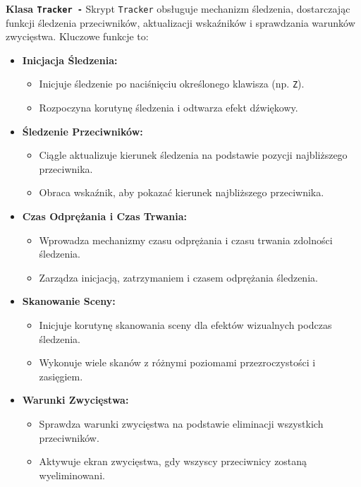 \textbf{Klasa \texttt{Tracker -}}
Skrypt \texttt{Tracker} obsługuje mechanizm śledzenia, dostarczając funkcji śledzenia przeciwników, aktualizacji wskaźników i sprawdzania warunków zwycięstwa. Kluczowe funkcje to:
\begin{itemize}
\item \textbf{Inicjacja Śledzenia:}
\begin{itemize}
\item Inicjuje śledzenie po naciśnięciu określonego klawisza (np. \texttt{Z}).
\item Rozpoczyna korutynę śledzenia i odtwarza efekt dźwiękowy.
\end{itemize}
\item \textbf{Śledzenie Przeciwników:}
\begin{itemize}
\item Ciągle aktualizuje kierunek śledzenia na podstawie pozycji najbliższego przeciwnika.
\item Obraca wskaźnik, aby pokazać kierunek najbliższego przeciwnika.
\end{itemize}
\item \textbf{Czas Odprężania i Czas Trwania:}
\begin{itemize}
\item Wprowadza mechanizmy czasu odprężania i czasu trwania zdolności śledzenia.
\item Zarządza inicjacją, zatrzymaniem i czasem odprężania śledzenia.
\end{itemize}
\item \textbf{Skanowanie Sceny:}
\begin{itemize}
\item Inicjuje korutynę skanowania sceny dla efektów wizualnych podczas śledzenia.
\item Wykonuje wiele skanów z różnymi poziomami przezroczystości i zasięgiem.
\end{itemize}
\item \textbf{Warunki Zwycięstwa:}
\begin{itemize}
\item Sprawdza warunki zwycięstwa na podstawie eliminacji wszystkich przeciwników.
\item Aktywuje ekran zwycięstwa, gdy wszyscy przeciwnicy zostaną wyeliminowani.
\end{itemize}
\end{itemize}

